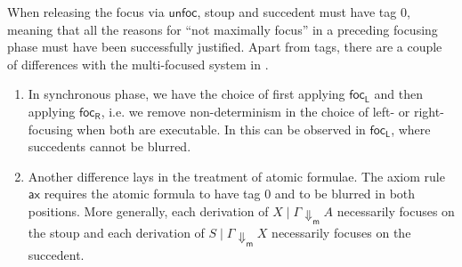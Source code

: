 \documentclass[runningheads]{llncs}
\newcommand{\tr}{\otimes \mathsf{R}}
\newcommand{\lleft}{{\multimap}\mathsf{L}}
\newcommand{\pass}{\mathsf{pass}}
\newcommand{\unitl}{\mathsf{IL}}
\newcommand{\unitr}{\mathsf{IR}}
\newcommand{\otR}{\tr}
\newcommand{\lolliL}{\lleft}
\newcommand{\IL}{\unitl}
\newcommand{\IR}{\unitr}
\newcommand{\ax}{\mathsf{ax}}
\newcommand{\red}[1]{{#1^1}}
\newcommand{\up}{\Uparrow}
\newcommand{\dn}{\Downarrow}
\newcommand{\dnm}{\Downarrow_{\mathsf{m}}}
\newcommand{\focL}{\mathsf{foc_L}}
\newcommand{\focR}{\mathsf{foc_R}}
\newcommand{\blurL}{\mathsf{blur_L}}
\newcommand{\unfoc}{\mathsf{unfoc}}
\begin{document}

When releasing the focus via $\unfoc$, stoup and succedent must have tag 0, meaning that all the reasons for ``not maximally focus'' in a preceding focusing phase must have been successfully justified. Apart from tags, there are a couple of differences with the multi-focused system in .
\begin{enumerate}
  \item In synchronous phase, we have the choice of first applying $\focL$ and then applying $\focR$, i.e. we remove non-determinism in the choice of left- or right-focusing when both are executable. In  this can be observed in $\focL$, where succedents cannot be blurred. %
\item Another difference lays in the treatment of atomic formulae. The axiom rule $\ax$ requires the atomic formula to have tag 0 and to be blurred in both positions. More generally, %
each derivation of $X \mid \Gamma \dnm A$ necessarily focuses on the stoup and each derivation of $S \mid \Gamma \dnm X$ necessarily focuses on the succedent.
\end{enumerate}
\end{document}
